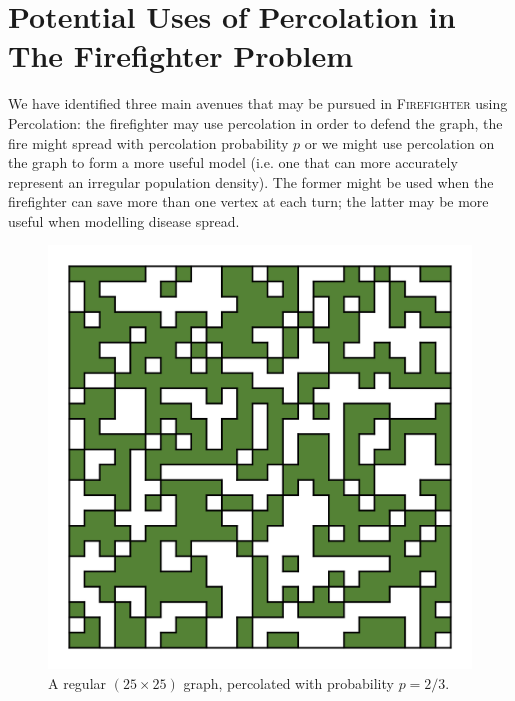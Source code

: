 \documentclass[11pt]{amsart}
\begin{document}

\section{Potential Uses of Percolation in The Firefighter Problem}

We have identified three main avenues that may be pursued in {\scshape Firefighter} using Percolation: the firefighter may use percolation in order to defend the graph, the fire might spread with percolation probability $p$ or we might use percolation on the graph to form a more useful model (i.e. one that can more accurately represent an irregular population density). The former might be used when the firefighter can save more than one vertex at each turn; the latter may be more useful when modelling disease spread.
\begin{figure}[ht]
	\centering
		\includegraphics[width=0.3\linewidth]{firebreak/25x25/25x25}
	\caption{A regular $(25\times25)$ graph, percolated with probability $p=2/3$.}
	\label{fig:largeperc}
\end{figure}

\end{document}
